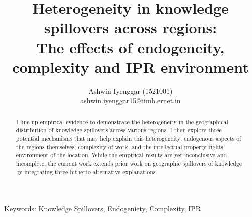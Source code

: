 \documentclass[12pt]{article}
\begin{document}
\title{\LARGE Heterogeneity in knowledge spillovers across regions:\\ \Large The effects of endogeneity,  complexity and IPR environment}
\author{Ashwin Iyenggar  (1521001) \\ ashwin.iyenggar15@iimb.ernet.in} 
\large

\maketitle
\thispagestyle{empty}

\begin{abstract}
\large \noindent I line up empirical evidence to demonstrate the heterogeneity in the geographical distribution of knowledge spillovers across various regions. I then explore  three potential mechanisms that may help explain this heterogeneity: endogenous aspects of the regions themselves, complexity of work, and the intellectual property rights environment of the location. While the empirical results are yet inconclusive and incomplete, the current work extends prior work on geographic spillovers of knowledge by  integrating three hitherto alternative explanations.
\end{abstract}
{Keywords:} Knowledge Spillovers, Endogeniety, Complexity, IPR
\doublespacing
\end{document}

